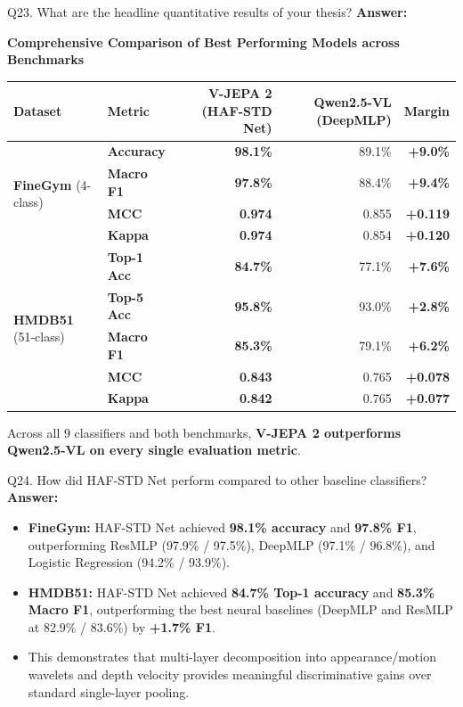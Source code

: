 \documentclass[a4paper, 11pt]{article}
\begin{document}
\begin{questionbox}{Q23. What are the headline quantitative results of your thesis?}
\textbf{Answer:}
\begin{center}
\small
\textbf{Comprehensive Comparison of Best Performing Models across Benchmarks}\\[4pt]
\begin{tabular}{llrrr}
\toprule
\textbf{Dataset} & \textbf{Metric} & \textbf{V-JEPA 2 (HAF-STD Net)} & \textbf{Qwen2.5-VL (DeepMLP)} & \textbf{Margin} \\
\midrule
\multirow{4}{*}{\textbf{FineGym} (4-class)} 
 & \textbf{Accuracy}  & \textbf{98.1\%} & 89.1\% & \textbf{+9.0\%} \\
 & \textbf{Macro F1}  & \textbf{97.8\%} & 88.4\% & \textbf{+9.4\%} \\
 & \textbf{MCC}       & \textbf{0.974}  & 0.855  & \textbf{+0.119} \\
 & \textbf{Kappa}     & \textbf{0.974}  & 0.854  & \textbf{+0.120} \\
\midrule
\multirow{5}{*}{\textbf{HMDB51} (51-class)} 
 & \textbf{Top-1 Acc} & \textbf{84.7\%} & 77.1\% & \textbf{+7.6\%} \\
 & \textbf{Top-5 Acc} & \textbf{95.8\%} & 93.0\% & \textbf{+2.8\%} \\
 & \textbf{Macro F1}  & \textbf{85.3\%} & 79.1\% & \textbf{+6.2\%} \\
 & \textbf{MCC}       & \textbf{0.843}  & 0.765  & \textbf{+0.078} \\
 & \textbf{Kappa}     & \textbf{0.842}  & 0.765  & \textbf{+0.077} \\
\bottomrule
\end{tabular}
\end{center}
Across all 9 classifiers and both benchmarks, \textbf{V-JEPA 2 outperforms Qwen2.5-VL on every single evaluation metric}.
\end{questionbox}

\begin{questionbox}{Q24. How did HAF-STD Net perform compared to other baseline classifiers?}
\textbf{Answer:}
\begin{itemize}
    \item \textbf{FineGym:} HAF-STD Net achieved \textbf{98.1\% accuracy} and \textbf{97.8\% F1}, outperforming ResMLP (97.9\% / 97.5\%), DeepMLP (97.1\% / 96.8\%), and Logistic Regression (94.2\% / 93.9\%).
    \item \textbf{HMDB51:} HAF-STD Net achieved \textbf{84.7\% Top-1 accuracy} and \textbf{85.3\% Macro F1}, outperforming the best neural baselines (DeepMLP and ResMLP at 82.9\% / 83.6\%) by \textbf{+1.7\% F1}.
    \item This demonstrates that multi-layer decomposition into appearance/motion wavelets and depth velocity provides meaningful discriminative gains over standard single-layer pooling.
\end{itemize}
\end{questionbox}
\end{document}
